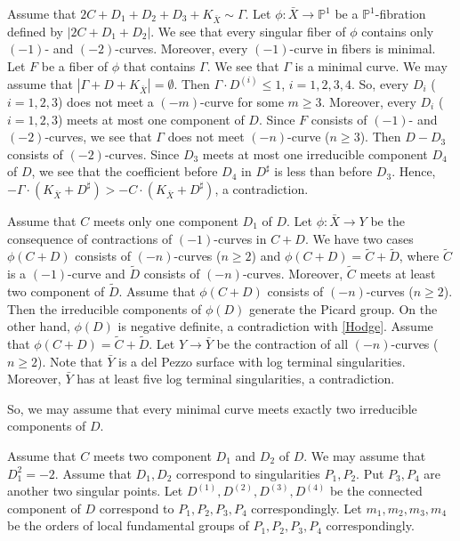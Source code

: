 \documentclass[10pt,oneside,reqno]{amsart}
\newcommand{\pp}{\mathbb{P}}
\theoremstyle{definition}
\theoremstyle{remark}
\numberwithin{equation}{section}
\begin{document}
Assume that $2C+D_1+D_2+D_3+K_{\bar{X}}\sim \Gamma$. Let $\phi\colon\bar{X}\rightarrow\pp^1$ be a $\pp^1$-fibration defined by $|2C+D_1+D_2|$. We see that every singular fiber of $\phi$ contains only $(-1)$- and $(-2)$-curves. Moreover, every $(-1)$-curve in fibers is minimal. Let $F$ be a fiber of $\phi$ that contains $\Gamma$. We see that $\Gamma$ is a minimal curve. We may assume that $|\Gamma+D+K_{\bar{X}}|=\emptyset$. Then $\Gamma\cdot D^{(i)}\leq 1$, $i=1,2,3,4$. So, every $D_i$ ($i=1,2,3$) does not meet a $(-m)$-curve for some $m\geq 3$. Moreover, every $D_i$ ($i=1,2,3$) meets at most one component of $D$. Since $F$ consists of $(-1)$- and $(-2)$-curves, we see that $\Gamma$ does not meet $(-n)$-curve ($n\geq 3$). Then $D-D_3$ consists of $(-2)$-curves. Since $D_3$ meets at most one irreducible component $D_4$ of $D$, we see that the coefficient before $D_4$ in $D^{\sharp}$ is less than before $D_3$. Hence, $-\Gamma\cdot(K_{\bar{X}}+D^{\sharp})>-C\cdot(K_{\bar{X}}+D^{\sharp})$, a contradiction.

Assume that $C$ meets only one component $D_1$ of $D$. Let $\phi\colon\bar{X}\rightarrow Y$ be the consequence of contractions of $(-1)$-curves in $C+D$. We have two cases $\phi(C+D)$ consists of $(-n)$-curves ($n\geq 2$) and  $\phi(C+D)=\tilde{C}+\tilde{D}$, where $\tilde{C}$ is a $(-1)$-curve and $\tilde{D}$ consists of $(-n)$-curves. Moreover, $\tilde{C}$ meets at least two component of $\tilde{D}$. Assume that $\phi(C+D)$ consists of $(-n)$-curves ($n\geq 2$). Then the irreducible components of $\phi(D)$ generate the Picard group. On the other hand, $\phi(D)$ is negative definite, a contradiction with \ref{Hodge}. Assume that $\phi(C+D)=\tilde{C}+\tilde{D}$. Let $Y\rightarrow\bar{Y}$ be the contraction of all $(-n)$-curves ($n\geq 2$). Note that $\bar{Y}$ is a del Pezzo surface with log terminal singularities. Moreover, $\bar{Y}$ has at least five log terminal singularities, a contradiction.

So, we may assume that every minimal curve meets exactly two irreducible components of $D$.




Assume that $C$ meets two component $D_1$ and $D_2$ of $D$. We may assume that $D_1^2=-2$. Assume that $D_1, D_2$ correspond to singularities $P_1,P_2$. Put $P_3, P_4$ are another two singular points. Let $D^{(1)}, D^{(2)}, D^{(3)}, D^{(4)}$ be the connected component of $D$ correspond to $P_1, P_2, P_3, P_4$ correspondingly. Let $m_1, m_2, m_3, m_4$ be the orders of local fundamental groups of $P_1, P_2, P_3, P_4$ correspondingly.
\end{document}
